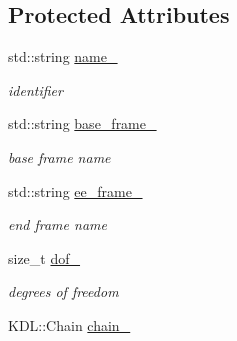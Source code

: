 \subsection*{Protected Attributes}
\begin{DoxyCompactItemize}
\item 
std\+::string \hyperlink{classow__ik_1_1RobotLimb_a4c5c8ab2736d40d50ee73ecdc736b02f}{name\+\_\+}\hypertarget{classow__ik_1_1RobotLimb_a4c5c8ab2736d40d50ee73ecdc736b02f}{}\label{classow__ik_1_1RobotLimb_a4c5c8ab2736d40d50ee73ecdc736b02f}

\begin{DoxyCompactList}\small\item\em identifier \end{DoxyCompactList}\item 
std\+::string \hyperlink{classow__ik_1_1RobotLimb_a9e35bc1ebe8a1c71d0774f2b7a6e3563}{base\+\_\+frame\+\_\+}\hypertarget{classow__ik_1_1RobotLimb_a9e35bc1ebe8a1c71d0774f2b7a6e3563}{}\label{classow__ik_1_1RobotLimb_a9e35bc1ebe8a1c71d0774f2b7a6e3563}

\begin{DoxyCompactList}\small\item\em base frame name \end{DoxyCompactList}\item 
std\+::string \hyperlink{classow__ik_1_1RobotLimb_aa4000dc89c83acbe2fc8708b2c4961df}{ee\+\_\+frame\+\_\+}\hypertarget{classow__ik_1_1RobotLimb_aa4000dc89c83acbe2fc8708b2c4961df}{}\label{classow__ik_1_1RobotLimb_aa4000dc89c83acbe2fc8708b2c4961df}

\begin{DoxyCompactList}\small\item\em end frame name \end{DoxyCompactList}\item 
size\+\_\+t \hyperlink{classow__ik_1_1RobotLimb_a1df068baa90a9d6518b3fc8cbb5be7b8}{dof\+\_\+}\hypertarget{classow__ik_1_1RobotLimb_a1df068baa90a9d6518b3fc8cbb5be7b8}{}\label{classow__ik_1_1RobotLimb_a1df068baa90a9d6518b3fc8cbb5be7b8}

\begin{DoxyCompactList}\small\item\em degrees of freedom \end{DoxyCompactList}\item 
K\+D\+L\+::\+Chain \hyperlink{classow__ik_1_1RobotLimb_a0fe281d61c3c98651d609320aa4488fe}{chain\+\_\+}\hypertarget{classow__ik_1_1RobotLimb_a0fe281d61c3c98651d609320aa4488fe}{}\label{classow__ik_1_1RobotLimb_a0fe281d61c3c98651d609320aa4488fe}


\end{DoxyCompactItemize}
